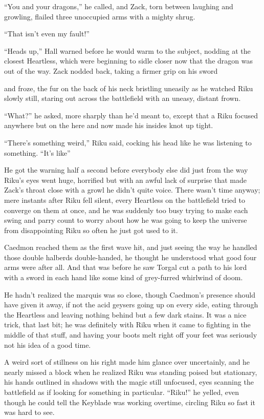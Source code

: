 ``You and your dragons,'' he called, and Zack, torn between laughing and growling, flailed three unoccupied arms with a mighty shrug.

``That isn't even my fault!''

``Heads up,'' Hall warned before he would warm to the subject, nodding at the closest Heartless, which were beginning to sidle closer now that the dragon was out of the way. Zack nodded back, taking a firmer grip on his sword\textemdash 

\textemdash and froze, the fur on the back of his neck bristling uneasily as he watched Riku slowly still, staring out across the battlefield with an uneasy, distant frown.

``What?'' he asked, more sharply than he'd meant to, except that a Riku focused anywhere but on the here and now made his insides knot up tight.

``There's something weird,'' Riku said, cocking his head like he was listening to something. ``It's like\textemdash''

He got the warning half a second before everybody else did just from the way Riku's eyes went huge, horrified but with an awful lack of surprise that made Zack's throat close with a growl he didn't quite voice. There wasn't time anyway; mere instants after Riku fell silent, every Heartless on the battlefield tried to converge on them at once, and he was suddenly too busy trying to make each swing and parry count to worry about how he was going to keep the universe from disappointing Riku so often he just got used to it.

Caedmon reached them as the first wave hit, and just seeing the way he handled those double halberds double-handed, he thought he understood what good four arms were after all. And that was before he saw Torgal cut a path to his lord with a sword in each hand like some kind of grey-furred whirlwind of doom.

He hadn't realized the marquis was so close, though Caedmon's presence should have given it away, if not the acid geysers going up on every side, eating through the Heartless and leaving nothing behind but a few dark stains. It was a nice trick, that last bit; he was definitely with Riku when it came to fighting in the middle of that stuff, and having your boots melt right off your feet was seriously not his idea of a good time.

A weird sort of stillness on his right made him glance over uncertainly, and he nearly missed a block when he realized Riku was standing poised but stationary, his hands outlined in shadows with the magic still unfocused, eyes scanning the battlefield as if looking for something in particular. ``Riku!'' he yelled, even though he could tell the Keyblade was working overtime, circling Riku so fast it was hard to see.

